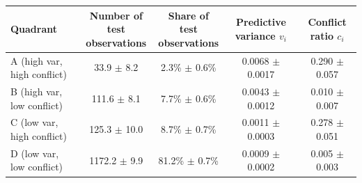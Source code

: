 \begin{tabular}{lcccc}
\hline
Quadrant & \shortstack{Number of test\\observations} & \shortstack{Share of test\\observations} & \shortstack{Predictive\\variance $v_i$} & \shortstack{Conflict\\ratio $c_i$} \\
\hline
A (high var, high conflict) & 33.9 $\pm$ 8.2 & 2.3\% $\pm$ 0.6\% & 0.0068 $\pm$ 0.0017 & 0.290 $\pm$ 0.057 \\
B (high var, low conflict) & 111.6 $\pm$ 8.1 & 7.7\% $\pm$ 0.6\% & 0.0043 $\pm$ 0.0012 & 0.010 $\pm$ 0.007 \\
C (low var, high conflict) & 125.3 $\pm$ 10.0 & 8.7\% $\pm$ 0.7\% & 0.0011 $\pm$ 0.0003 & 0.278 $\pm$ 0.051 \\
D (low var, low conflict) & 1172.2 $\pm$ 9.9 & 81.2\% $\pm$ 0.7\% & 0.0009 $\pm$ 0.0002 & 0.005 $\pm$ 0.003 \\
\hline
\end{tabular}